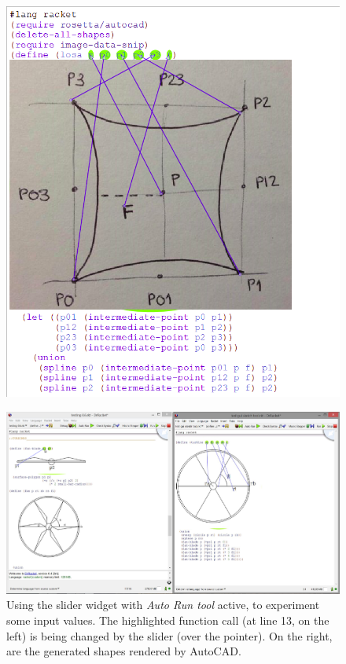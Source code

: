 \begin{figure}[h]
\begin{minipage}[t]{.495\textwidth}
  \includegraphics[width=1\linewidth]{images/losa}
  \label{fig:losa1}
\end{minipage}
\end{figure}

\begin{figure}[!h]
  \centering
  \includegraphics[width=1\textwidth]{images/turbine}
    \caption{Using the slider widget with \textit{Auto Run tool} active, to experiment some input values. The highlighted function call (at line 13, on the left) is being changed by the slider (over the pointer). On the right, are the generated shapes rendered by AutoCAD.}
  \label{fig:turbine}
\end{figure}


